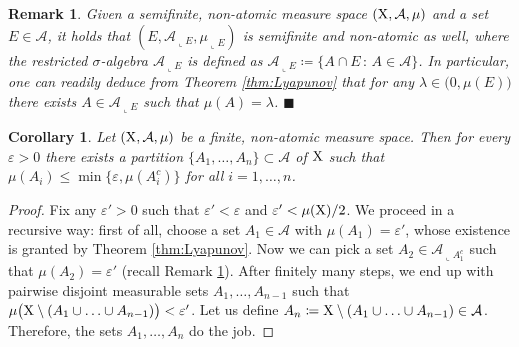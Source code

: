 \documentclass[reqno]{amsart}
\numberwithin{equation}{section}
\newcommand{\X}{{\rm X}}
\newcommand{\1}{\mathbbm 1}
\newcommand{\eps}{\varepsilon}
\newcommand{\fr}{\penalty-20\null\hfill\(\blacksquare\)}
\newtheorem{corollary}[theorem]{Corollary}
\newtheorem{remark}[theorem]{Remark}
\begin{document}
%
%
\begin{remark}\label{rmk:localise_Lyapunov}{\rm
Given a semifinite, non-atomic measure space \((\X,\mathcal A,\mu)\) and
a set \(E\in\mathcal A\), it holds that \((E,\mathcal A_{\llcorner E},\mu_{\llcorner E})\)
is semifinite and non-atomic as well, where the restricted \(\sigma\)-algebra
\(\mathcal A_{\llcorner E}\) is defined as
\(\mathcal A_{\llcorner E}\coloneqq\big\{A\cap E\,:\,A\in\mathcal A\big\}\).
In particular, one can readily deduce from Theorem \ref{thm:Lyapunov} that for any
\(\lambda\in\big(0,\mu(E)\big)\) there exists \(A\in\mathcal A_{\llcorner E}\)
such that \(\mu(A)=\lambda\).
\fr}\end{remark}
%
%
\begin{corollary}\label{cor:conseq_Lyapunov}
Let \((\X,\mathcal A,\mu)\) be a finite, non-atomic measure space.
Then for every \(\eps>0\) there exists a partition \(\{A_1,\ldots,A_n\}\subset\mathcal A\)
of \(\X\) such that \(\mu(A_i)\leq\min\big\{\eps,\mu(A_i^c)\big\}\) for all
\(i=1,\ldots,n\).
\end{corollary}
\begin{proof}
Fix any \(\eps'>0\) such that \(\eps'<\eps\) and \(\eps'<\mu(\X)/2\).
We proceed in a recursive way: first of all, choose a set \(A_1\in\mathcal A\) with
\(\mu(A_1)=\eps'\), whose existence is granted by Theorem \ref{thm:Lyapunov}.
Now we can pick a set \(A_2\in\mathcal A_{\llcorner A_1^c}\) such that \(\mu(A_2)=\eps'\)
(recall Remark \ref{rmk:localise_Lyapunov}). After finitely many steps, we end up
with pairwise disjoint measurable sets \(A_1,\ldots,A_{n-1}\) such that
\(\mu\big(\X\setminus(A_1\cup\ldots\cup A_{n-1})\big)<\eps'\). Let us define
\(A_n\coloneqq\X\setminus(A_1\cup\ldots\cup A_{n-1})\in\mathcal A\). Therefore,
the sets \(A_1,\ldots,A_n\) do the job.
\end{proof}
%
%
%
%
\def\cprime{$'$} \def\cprime{$'$}
\end{document}
